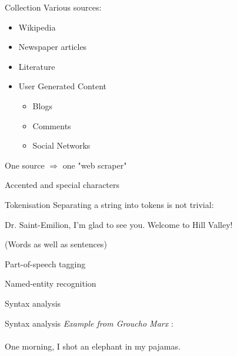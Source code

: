 \begin{frame}{Collection}
  Various sources:
  \begin{itemize}
  \item Wikipedia
  \item Newspaper articles
  \item Literature
  \item User Generated Content
    \begin{itemize}
    \item Blogs
    \item Comments
    \item Social Networks
    \end{itemize}
  \end{itemize}
  One source $\Rightarrow$ one "web scraper"
\end{frame}

\begin{frame}{Accented and special characters}
\end{frame}

\begin{frame}{Tokenisation}
  Separating a string into tokens is not trivial:

  \begin{center}
    Dr. Saint-Emilion, I'm glad to see you. Welcome to Hill Valley!
  \end{center}

  (Words as well as sentences)
\end{frame}

\begin{frame}{Part-of-speech tagging}
\end{frame}

\begin{frame}{Named-entity recognition}
\end{frame}

\begin{frame}{Syntax analysis}
\end{frame}

\begin{frame}{Syntax analysis}
  \vfill
  \textit{Example from Groucho Marx} :\\\\

  One morning, I shot an elephant in my pajamas.

  \vfill
\end{frame}

